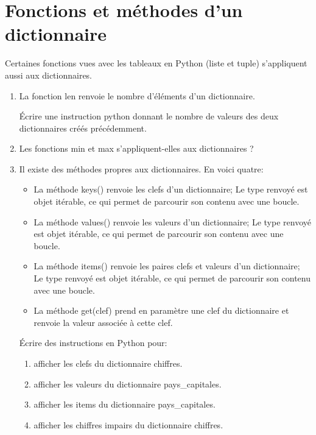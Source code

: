 \documentclass[12pt,a4paper]{article}
\begin{document}
\section*{Fonctions et méthodes d'un dictionnaire}

Certaines fonctions vues avec les tableaux en Python (liste et tuple) s'appliquent aussi aux dictionnaires.

\begin{enumerate}
\item La fonction \textsf{len} renvoie le nombre d'éléments d'un dictionnaire.

Écrire une instruction python donnant le nombre de valeurs des deux dictionnaires créés précédemment.

\item Les fonctions \textsf{min} et \textsf{max} s'appliquent-elles aux dictionnaires ?

\item Il existe des méthodes propres aux dictionnaires. En voici quatre:

\begin{itemize}[label=\textbullet]
\item La méthode \textsf{keys()} renvoie les clefs d'un dictionnaire; Le type renvoyé est objet itérable, ce qui permet de parcourir son contenu avec une boucle.

\item La méthode \textsf{values()} renvoie les valeurs d'un dictionnaire; Le type renvoyé est objet itérable, ce qui permet de parcourir son contenu avec une boucle.

\item La méthode \textsf{items()} renvoie les paires clefs et valeurs d'un dictionnaire; Le type renvoyé est objet itérable, ce qui permet de parcourir son contenu avec une boucle.

\item La méthode \textsf{get(clef)} prend en paramètre une clef du dictionnaire et renvoie la valeur associée à cette clef.
\end{itemize}

Écrire des instructions en Python pour:
\begin{enumerate}
\item afficher les clefs du dictionnaire \textsf{chiffres}.
\item afficher les valeurs du dictionnaire \textsf{pays\_capitales}.
\item afficher les items du dictionnaire \textsf{pays\_capitales}.
\item afficher les chiffres impairs du dictionnaire \textsf{chiffres}.
\end{enumerate}

\end{enumerate}
\end{document}
